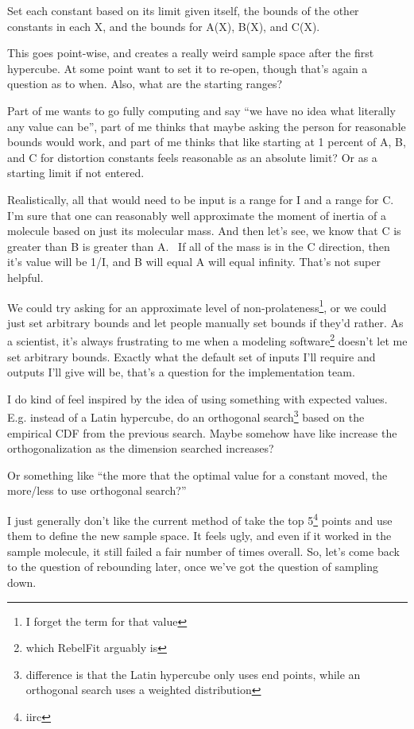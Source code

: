 \documentclass[12pt]{article}
\newcommand{\say}[1]{``#1''}
\renewcommand{\,}{\textsuperscript{,}}
\begin{document}
Set each constant based on its limit given itself, the bounds of the other constants in each X, and the bounds for A(X), B(X), and C(X).

This goes point-wise, and creates a really weird sample space after the first hypercube.  
At some point want to set it to re-open, though that's again a question as to when.  
Also, what are the starting ranges?

Part of me wants to go fully computing and say \say{we have no idea what literally any value can be}, part of me thinks that maybe asking the person for reasonable bounds would work, and part of me thinks that like starting at 1 percent of A, B, and C for distortion constants feels reasonable as an absolute limit?  
Or as a starting limit if not entered.

Realistically, all that would need to be input is a range for I and a range for C.  
I'm sure that one can reasonably well approximate the moment of inertia of a molecule based on just its molecular mass.  
And then let's see, we know that C is greater than B is greater than A.   
If all of the mass is in the C direction, then it's value will be 1/I, and B will equal A will equal infinity.  
That's not super helpful.

We could try asking for an approximate level of non-prolateness\footnote{I forget the term for that value}, or we could just set arbitrary bounds and let people manually set bounds if they'd rather.  
As a scientist, it's always frustrating to me when a modeling software\footnote{which RebelFit arguably is} doesn't let me set arbitrary bounds.  
Exactly what the default set of inputs I'll require and outputs I'll give will be, that's a question for the implementation team.

I do kind of feel inspired by the idea of using something with expected values.  
E.g. instead of a Latin hypercube, do an orthogonal search\footnote{difference is that the Latin hypercube only uses end points, while an orthogonal search uses a weighted distribution} based on the empirical CDF from the previous search.  
Maybe somehow have like increase the orthogonalization as the dimension searched increases?

Or something like \say{the more that the optimal value for a constant moved, the more/less to use orthogonal search?}

I just generally don't like the current method of take the top 5\footnote{iirc} points and use them to define the new sample space.  
It feels ugly, and even if it worked in the sample molecule, it still failed a fair number of times overall.  
So, let's come back to the question of rebounding later, once we've got the question of sampling down.
\end{document}
